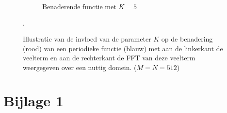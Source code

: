 \documentclass[a4paper]{article}
\begin{document}
\begin{figure}
\begin{subfigure}[b]{\textwidth}
        \caption{Benaderende functie met $K=5$}
        \label{fig:periotrigc}
        \vspace*{1cm}
    \end{subfigure}
    \caption{Illustratie van de invloed van de parameter $K$ op de benadering (rood) van een periodieke functie (blauw) met aan de linkerkant de veelterm en aan de rechterkant de FFT van deze veelterm weergegeven over een nuttig domein. ($M = N = 512$)}\label{fig:periotrig}.
\end{figure}
\newpage
\section*{Bijlage 1} 

\label{bijlage1}
\end{document}
